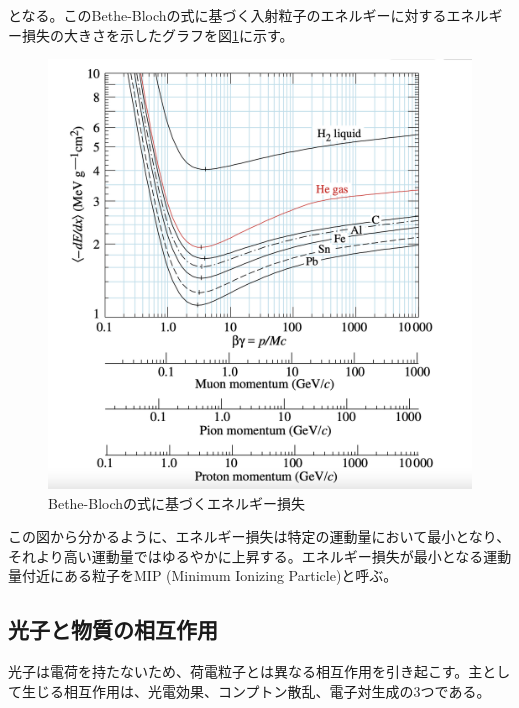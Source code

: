 となる。このBethe-Blochの式に基づく入射粒子のエネルギーに対するエネルギー損失の大きさを示したグラフを図\ref{Bethe}に示す\cite{PDG_Interaction}。
\begin{figure}[H]
	\begin{center}
		\includegraphics[width=370pt]{./Figure/EcalDetector/Bethe.png}
		\caption[Bethe-Blochの式に基づくエネルギー損失]{Bethe-Blochの式に基づくエネルギー損失}
		\label{Bethe}
	\end{center}
\end{figure}


この図から分かるように、エネルギー損失は特定の運動量において最小となり、それより高い運動量ではゆるやかに上昇する。エネルギー損失が最小となる運動量付近にある粒子をMIP (Minimum Ionizing Particle)と呼ぶ。

\subsection{光子と物質の相互作用}
光子は電荷を持たないため、荷電粒子とは異なる相互作用を引き起こす。主として生じる相互作用は、光電効果、コンプトン散乱、電子対生成の3つである。

